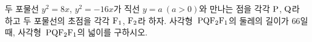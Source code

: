 두 포물선 $y^2=8x$, $y^2=-16x$가 직선 $y=a\ (a>0)$와 만나는 점을 각각 $\mathrm{P}$, $\mathrm{Q}$라 하고 두 포물선의 초점을 각각 $\mathrm{F}_1$, $\mathrm{F}_2$라 하자. 사각형~$\mathrm{PQF_2F_1}$의 둘레의 길이가 $66$일 때, 사각형~$\mathrm{PQF_2F_1}$의 넓이를 구하시오.
